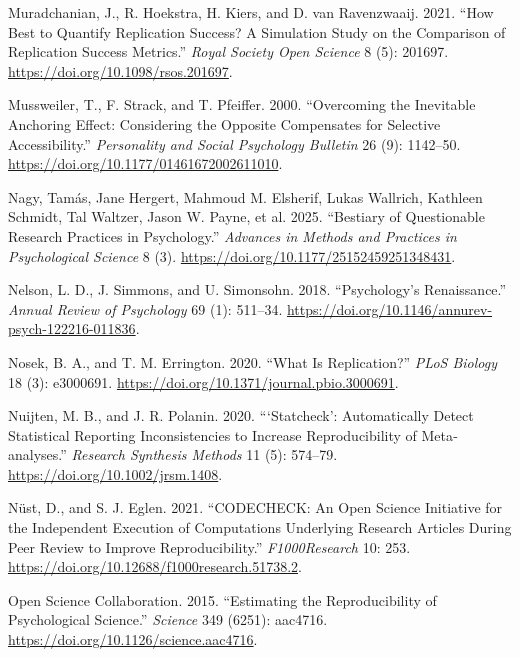 \documentclass[
  letterpaper,
  DIV=11,
  openany,
  fontsize=12pt,
  parskip=half,
  headings=big,
  numbers=noenddot,
  titlepage=false]{scrreprt}
\newlength{\cslhangindent}
\newenvironment{CSLReferences}[2] %
 {\begin{list}{}{%
  \setlength{\itemindent}{0pt}
  \setlength{\leftmargin}{0pt}
  \setlength{\parsep}{0pt}
  \ifodd #1
   \setlength{\leftmargin}{\cslhangindent}
   \setlength{\itemindent}{-1\cslhangindent}
  \fi
  \setlength{\itemsep}{#2\baselineskip}}}
 {\end{list}}
\begin{document}
\begin{CSLReferences}{1}{0}
Muradchanian, J., R. Hoekstra, H. Kiers, and D. van Ravenzwaaij. 2021.
{``How Best to Quantify Replication Success? A Simulation Study on the
Comparison of Replication Success Metrics.''} \emph{Royal Society Open
Science} 8 (5): 201697. \url{https://doi.org/10.1098/rsos.201697}.

Mussweiler, T., F. Strack, and T. Pfeiffer. 2000. {``Overcoming the
Inevitable Anchoring Effect: Considering the Opposite Compensates for
Selective Accessibility.''} \emph{Personality and Social Psychology
Bulletin} 26 (9): 1142--50.
\url{https://doi.org/10.1177/01461672002611010}.

Nagy, Tamás, Jane Hergert, Mahmoud M. Elsherif, Lukas Wallrich, Kathleen
Schmidt, Tal Waltzer, Jason W. Payne, et al. 2025. {``Bestiary of
Questionable Research Practices in Psychology.''} \emph{Advances in
Methods and Practices in Psychological Science} 8 (3).
\url{https://doi.org/10.1177/25152459251348431}.

Nelson, L. D., J. Simmons, and U. Simonsohn. 2018. {``Psychology's
Renaissance.''} \emph{Annual Review of Psychology} 69 (1): 511--34.
\url{https://doi.org/10.1146/annurev-psych-122216-011836}.

Nosek, B. A., and T. M. Errington. 2020. {``What Is Replication?''}
\emph{PLoS Biology} 18 (3): e3000691.
\url{https://doi.org/10.1371/journal.pbio.3000691}.

Nuijten, M. B., and J. R. Polanin. 2020. {``{`Statcheck'}: Automatically
Detect Statistical Reporting Inconsistencies to Increase Reproducibility
of Meta‐analyses.''} \emph{Research Synthesis Methods} 11 (5): 574--79.
\url{https://doi.org/10.1002/jrsm.1408}.

Nüst, D., and S. J. Eglen. 2021. {``CODECHECK: An Open Science
Initiative for the Independent Execution of Computations Underlying
Research Articles During Peer Review to Improve Reproducibility.''}
\emph{F1000Research} 10: 253.
\url{https://doi.org/10.12688/f1000research.51738.2}.

Open Science Collaboration. 2015. {``Estimating the Reproducibility of
Psychological Science.''} \emph{Science} 349 (6251): aac4716.
\url{https://doi.org/10.1126/science.aac4716}.


\end{CSLReferences}
\end{document}
